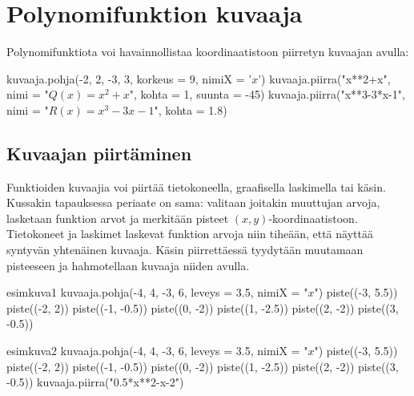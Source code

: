 \section{Polynomifunktion kuvaaja}
Polynomifunktiota voi
havainnollistaa koordinaatistoon piirretyn kuvaajan avulla:



\begin{kuva}
kuvaaja.pohja(-2, 2, -3, 3, korkeus = 9, nimiX = '$x$')
kuvaaja.piirra("x**2+x", nimi = "$Q(x) = x^2+x$", kohta = 1, suunta = -45)
kuvaaja.piirra("x**3-3*x-1", nimi = "$R(x) = x^3-3x-1$", kohta = 1.8)
\end{kuva}

\subsection*{Kuvaajan piirtäminen}


Funktioiden kuvaajia voi piirtää tietokoneella, graafisella laskimella tai käsin. Kussakin tapauksessa periaate on sama: valitaan joitakin muuttujan arvoja, lasketaan funktion arvot ja merkitään pisteet $(x,y)$-koordinaatistoon. Tietokoneet ja laskimet laskevat funktion arvoja niin tiheään, että näyttää syntyvän yhtenäinen kuvaaja. Käsin piirrettäessä tyydytään muutamaan pisteeseen ja hahmotellaan kuvaaja niiden avulla.

\begin{luoKuva}{esimkuva1}
kuvaaja.pohja(-4, 4, -3, 6, leveys = 3.5, nimiX = "$x$")
piste((-3, 5.5))
piste((-2, 2))
piste((-1, -0.5))
piste((0, -2))
piste((1, -2.5))
piste((2, -2))
piste((3, -0.5))
\end{luoKuva}
\begin{luoKuva}{esimkuva2}
kuvaaja.pohja(-4, 4, -3, 6, leveys = 3.5, nimiX = "$x$")
piste((-3, 5.5))
piste((-2, 2))
piste((-1, -0.5))
piste((0, -2))
piste((1, -2.5))
piste((2, -2))
piste((3, -0.5))
kuvaaja.piirra("0.5*x**2-x-2")
\end{luoKuva}

